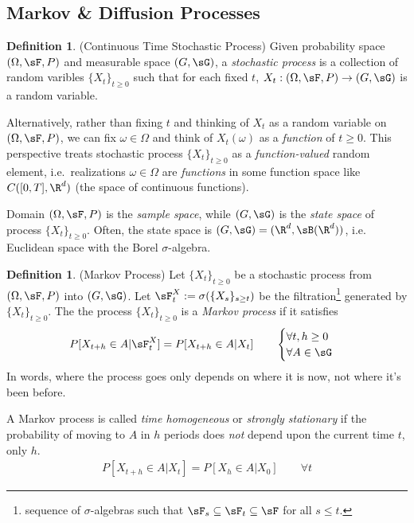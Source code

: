 \documentclass[12pt]{article}
\theoremstyle{plain}
\theoremstyle{definition}
\newtheorem{defn}[thm]{Definition}
\theoremstyle{remark}
\newcommand{\ra}{\rightarrow}
\begin{document}
\subsection{Markov \& Diffusion Processes}

\begin{defn}(Continuous Time Stochastic Process)
Given probability space $(\Omega,\sF,P)$ and measurable space
$(G,\sG)$, a \emph{stochastic process} is a collection of random
varibles $\{X_t\}_{t\geq 0}$ such that for each fixed $t$,
$X_t:(\Omega,\sF,P)\ra(G,\sG)$ is a random variable.

Alternatively, rather than fixing $t$ and thinking of $X_t$ as a random
variable on $(\Omega,\sF,P)$, we can fix $\omega\in\Omega$ and think of
$X_t(\omega)$ as a \emph{function} of $t\geq 0$.
This perspective treats stochastic process $\{X_t\}_{t\geq 0}$ as a
\emph{function-valued} random element, i.e.\ realizations
$\omega\in\Omega$ are \emph{functions} in some function space like
$C([0,T],\R^d)$ (the space of continuous functions).

Domain $(\Omega,\sF,P)$ is the \emph{sample space}, while $(G,\sG)$
is the \emph{state space} of process $\{X_t\}_{t\geq 0}$.
Often, the state space is $(G,\sG)=(\R^d,\sB(\R^d))$, i.e. Euclidean
space with the Borel $\sigma$-algebra.
\end{defn}

\begin{defn}(Markov Process)
Let $\{X_t\}_{t\geq 0}$ be a stochastic process from $(\Omega,\sF,P)$
into $(G,\sG)$.
Let $\sF_t^X:=\sigma(\{X_s\}_{s\geq t})$ be the filtration\footnote{%
  sequence of $\sigma$-algebras such that
  $\sF_s\subseteq\sF_t\subseteq\sF$ for all $s\leq t$.
}
generated by $\{X_t\}_{t\geq 0}$.
The the process $\{X_t\}_{t\geq 0}$ is a \emph{Markov process} if it
satisfies
\begin{align*}
  P[X_{t+h}\in A|\sF_t^X]
  =
  P[X_{t+h}\in A|X_t]
  \qquad
  \begin{cases}
    \forall t,h\geq 0
    \\
    \forall A\in\sG
  \end{cases}
\end{align*}
In words, where the process goes only depends on where it is now, not
where it's been before.

A Markov process is called \emph{time homogeneous} or
\emph{strongly stationary} if the probability of moving to $A$ in $h$
periods does \emph{not} depend upon the current time $t$, only $h$.
\begin{align}
  P[X_{t+h}\in A|X_t]
  =
  P[X_{h}\in A|X_0]
  \qquad
  \forall t
  \label{timehomog}
\end{align}
\end{defn}
\end{document}
